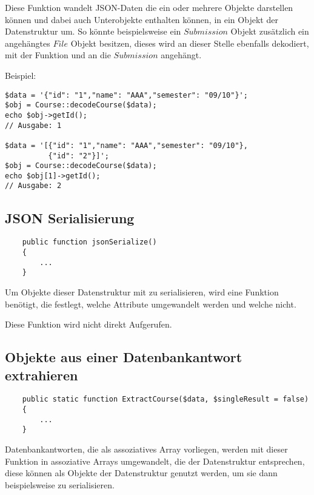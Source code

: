 Diese Funktion wandelt JSON-Daten die ein oder mehrere Objekte darstellen können und dabei auch Unterobjekte enthalten können, in ein Objekt der Datenstruktur um. So könnte beispielsweise ein $Submission$ Objekt zusätzlich ein angehängtes $File$ Objekt besitzen, dieses wird an dieser Stelle ebenfalls dekodiert, mit der  Funktion und an die $Submission$ angehängt.

\begin{minipage}{\textwidth}
Beispiel:
\begin{lstlisting}
$data = '{"id": "1","name": "AAA","semester": "09/10"}';
$obj = Course::decodeCourse($data);
echo $obj->getId();
// Ausgabe: 1

$data = '[{"id": "1","name": "AAA","semester": "09/10"},
          {"id": "2"}]';
$obj = Course::decodeCourse($data);
echo $obj[1]->getId();
// Ausgabe: 2
\end{lstlisting}
\end{minipage}

\subsection{JSON Serialisierung}
\begin{minipage}{\textwidth}
\begin{lstlisting}
    public function jsonSerialize() 
    {
    	...
    }
\end{lstlisting}
\end{minipage}

Um Objekte dieser Datenstruktur mit  zu serialisieren, wird eine  Funktion benötigt, die festlegt, welche Attribute umgewandelt werden und welche nicht. 

Diese Funktion wird nicht direkt Aufgerufen.

\subsection{Objekte aus einer Datenbankantwort extrahieren}
\begin{minipage}{\textwidth}
\begin{lstlisting}
    public static function ExtractCourse($data, $singleResult = false)
    {
    	...
    }
\end{lstlisting}
\end{minipage}

Datenbankantworten, die als assoziatives Array vorliegen, werden mit dieser Funktion in assoziative Arrays umgewandelt, die der Datenstruktur entsprechen, diese können als Objekte der Datenstruktur genutzt werden, um sie dann beispielsweise zu serialisieren.

